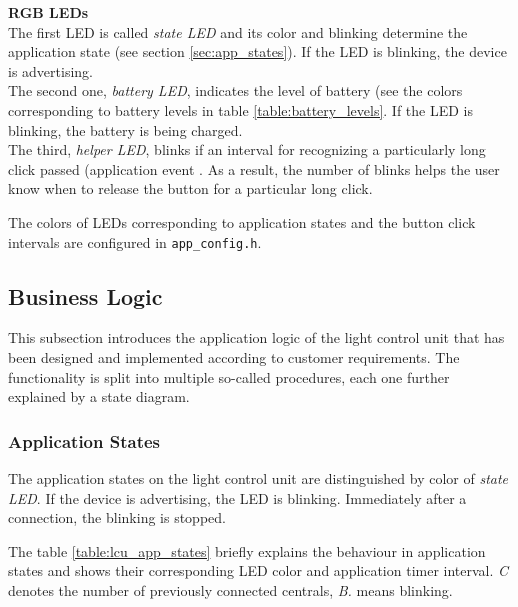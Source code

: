         
        \textbf{RGB LEDs}\\
            \label{sec:lcu_rgb_leds}
            The first LED is called \textit{state LED} and its color and blinking determine the application state (see section \ref{sec:app_states}). If the LED is blinking, the device is advertising.\\
            The second one, \textit{battery LED}, indicates the level of battery (see the colors corresponding to battery levels in table \ref{table:battery_levels}. If the LED is blinking, the battery is being charged.\\
            The third, \textit{helper LED}, blinks if an interval for recognizing a particularly long click passed (application event . As a result, the number of blinks helps the user know when to release the button for a particular long click.
            
            
            The colors of LEDs corresponding to application states and the button click intervals are configured in \verb|app_config.h|.
            
    
    \subsection{Business Logic}
        This subsection introduces the application logic of the light control unit that has been designed and implemented according to customer requirements. The functionality is split into multiple so-called procedures, each one further explained by a state diagram.
                
        \subsubsection{Application States}
            \label{sec:lcu_app_states}
            The application states on the light control unit are distinguished by color of \textit{state LED}. If the device is advertising, the LED is blinking. Immediately after a connection, the blinking is stopped. 
            
            The table \ref{table:lcu_app_states} briefly explains the behaviour in application states and shows their corresponding LED color and application timer interval. \textit{C} denotes the number of previously connected centrals, \textit{B.} means blinking.
            
